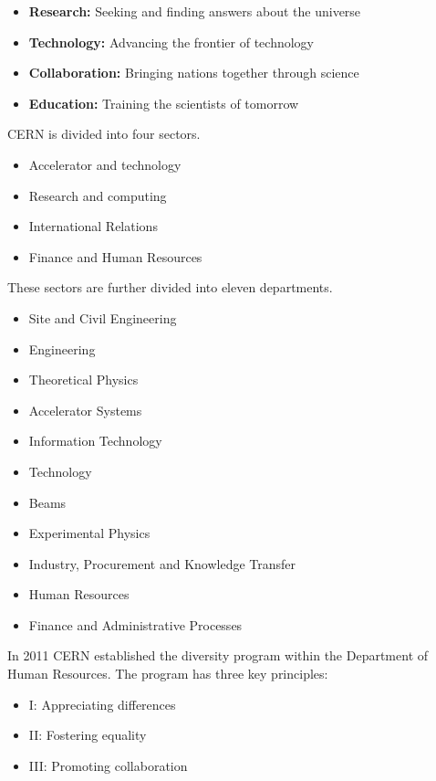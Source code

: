 \begin{itemize}
    \item \textbf{Research:} Seeking and finding answers about the universe
    \item \textbf{Technology:} Advancing the frontier of technology  
    \item \textbf{Collaboration:} Bringing nations together through science 
    \item \textbf{Education:} Training the scientists of tomorrow    
\end{itemize}

\noindent CERN is divided into four sectors.

\begin{itemize}
    \item Accelerator and technology
    \item Research and computing
    \item International Relations
    \item Finance and Human Resources
\end{itemize}

\noindent These sectors are further divided into eleven departments.

\begin{itemize}
    \item Site and Civil Engineering
    \item Engineering
    \item Theoretical Physics
    \item Accelerator Systems
    \item Information Technology
    \item Technology
    \item Beams
    \item Experimental Physics
    \item Industry, Procurement and Knowledge Transfer
    \item Human Resources
    \item Finance and Administrative Processes
\end{itemize}


In 2011 CERN established the diversity program within the Department of Human Resources. The program has three key principles:

\begin{itemize}
    \item   I:   Appreciating differences
    \item  II:  Fostering equality
    \item III: Promoting collaboration 
\end{itemize}

